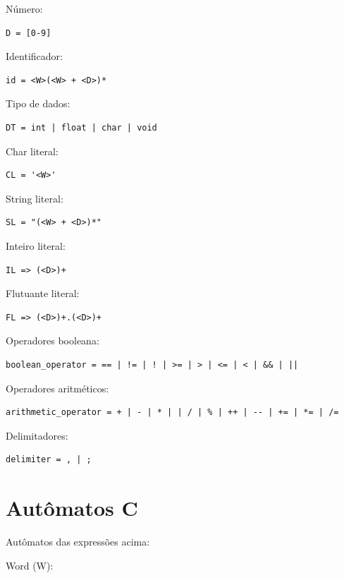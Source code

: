 \documentclass[]{article}
\numberwithin{equation}{section}
\begin{document}
Número:
\begin{lstlisting}
D = [0-9]
\end{lstlisting}

Identificador:
\begin{lstlisting}
id = <W>(<W> + <D>)*
\end{lstlisting}

Tipo de dados:
\begin{lstlisting}
DT = int | float | char | void
\end{lstlisting}

Char literal:
\begin{lstlisting}
CL = '<W>'
\end{lstlisting}

String literal:
\begin{lstlisting}
SL = "(<W> + <D>)*"
\end{lstlisting}

Inteiro literal:
\begin{lstlisting}
IL => (<D>)+
\end{lstlisting}

Flutuante literal:
\begin{lstlisting}
FL => (<D>)+.(<D>)+
\end{lstlisting}

Operadores booleana:
\begin{lstlisting}
boolean_operator = == | != | ! | >= | > | <= | < | && | ||
\end{lstlisting}

Operadores aritméticos:
\begin{lstlisting}
arithmetic_operator = + | - | * | | / | % | ++ | -- | += | *= | /=
\end{lstlisting}

Delimitadores:
\begin{lstlisting}
delimiter = , | ; 
\end{lstlisting}

\section{Autômatos C}
Autômatos das expressões acima:

Word (W):
\begin{center}
\end{center}
\end{document}

